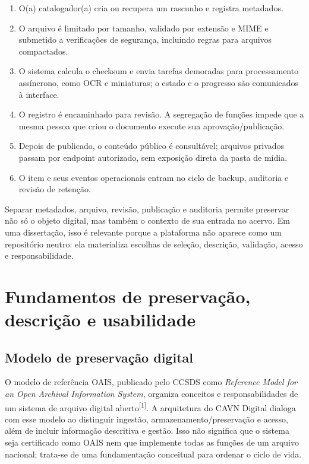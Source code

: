 \documentclass[11pt,a4paper]{article}
\newcommand{\sourcecite}[1]{\textsuperscript{[#1]}}
\begin{document}
\begin{enumerate}
  \item O(a) catalogador(a) cria ou recupera um rascunho e registra metadados.
  \item O arquivo é limitado por tamanho, validado por extensão e MIME e submetido a verificações de segurança, incluindo regras para arquivos compactados.
  \item O sistema calcula o checksum e envia tarefas demoradas para processamento assíncrono, como OCR e miniaturas; o estado e o progresso são comunicados à interface.
  \item O registro é encaminhado para revisão. A segregação de funções impede que a mesma pessoa que criou o documento execute sua aprovação/publicação.
  \item Depois de publicado, o conteúdo público é consultável; arquivos privados passam por endpoint autorizado, sem exposição direta da pasta de mídia.
  \item O item e seus eventos operacionais entram no ciclo de backup, auditoria e revisão de retenção.
\end{enumerate}

\begin{conceptbox}[title=Por que a arquitetura importa para a memória institucional?]
Separar metadados, arquivo, revisão, publicação e auditoria permite preservar não só o objeto digital, mas também o contexto de sua entrada no acervo. Em uma dissertação, isso é relevante porque a plataforma não aparece como um repositório neutro: ela materializa escolhas de seleção, descrição, validação, acesso e responsabilidade.
\end{conceptbox}

\section{Fundamentos de preservação, descrição e usabilidade}

\subsection{Modelo de preservação digital}

O modelo de referência OAIS, publicado pelo CCSDS como \textit{Reference Model for an Open Archival Information System}, organiza conceitos e responsabilidades de um sistema de arquivo digital aberto\sourcecite{1}. A arquitetura do CAVN Digital dialoga com esse modelo ao distinguir ingestão, armazenamento/preservação e acesso, além de incluir informação descritiva e gestão. Isso não significa que o sistema seja certificado como OAIS nem que implemente todas as funções de um arquivo nacional; trata-se de uma fundamentação conceitual para ordenar o ciclo de vida.
\end{document}
